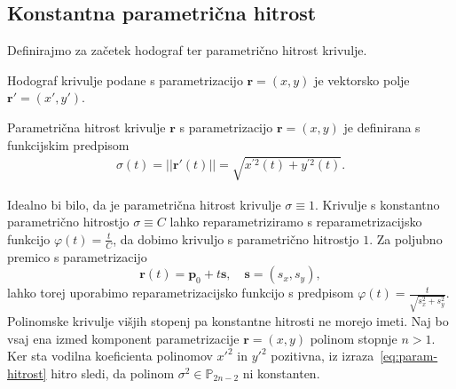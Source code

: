 \documentclass[isrm2, tisk]{fmfdelo}
\newcommand{\p}{\mathbf{p}}
\begin{document}
    \subsection{Konstantna parametrična hitrost}\label{sec:konstantna-hitrost}
    Definirajmo za začetek hodograf ter parametrično hitrost krivulje.
    \begin{definicija}
        Hodograf krivulje podane s parametrizacijo $\mathbf{r}=(x,y)$ je vektorsko polje $\mathbf{r'}=(x',y')$.
    \end{definicija}
    \begin{definicija}
        Parametrična hitrost krivulje $\mathbf{r}$ s parametrizacijo $\mathbf{r}= \left(x,y\right)$ je definirana s funkcijskim predpisom
        \begin{align}
            \sigma(t)= ||\mathbf{r'}(t)|| = \sqrt {x^{'2}(t)+y^{'2}(t)}. \label{eq:param-hitrost}
        \end{align}
    \end{definicija}
    \noindent Idealno bi bilo, da je parametrična hitrost krivulje $\sigma \equiv 1$.
    Krivulje s konstantno parametrično hitrostjo $\sigma\equiv C$ lahko reparametriziramo s reparametrizacijsko funkcijo $\varphi(t)=\frac{t}{C}$, da dobimo krivuljo s parametrično hitrostjo $1$.
    Za poljubno premico s parametrizacijo
    \[\mathbf{r}(t) = \p_0 + t\mathbf{s},\quad  \mathbf{s} = (s_x,s_y),\]
    lahko torej uporabimo reparametrizacijsko funkcijo s predpisom $\varphi(t) = \frac{t}{\sqrt{s_x^2+s_y^2}}$.
    Polinomske krivulje višjih stopenj pa konstantne hitrosti ne morejo imeti.
    Naj bo vsaj ena izmed komponent parametrizacije $\mathbf{r}=(x,y)$ polinom stopnje $n>1$.
    Ker sta vodilna koeficienta polinomov $x'^2$ in $y'^2$ pozitivna, iz izraza~\eqref{eq:param-hitrost} hitro sledi, da polinom $\sigma^2\in\mathbb{P}_{2n-2}$ ni konstanten.
\end{document}
